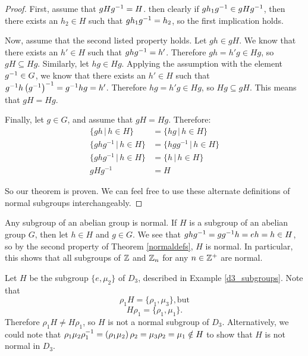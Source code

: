 \begin{proof}
First, assume that $gH\inv{g} = H$. then clearly if $gh_1\inv{g} \in gH\inv{g}$, then there exists an $h_2 \in H$ such that $gh_1\inv{g} = h_2$, so the first implication holds.

Now, assume that the second listed property holds. Let $gh \in gH$. We know that there exists an $h' \in H$ such that $gh\inv{g} = h'$. Therefore $gh = h'g \in Hg$, so $gH \subseteq Hg$. Similarly, let $hg \in Hg$. Applying the assumption with the element $\inv{g} \in G$, we know that there exists an $h' \in H$ such that $\inv{g}h\left(\inv{g}\right)^{-1} = \inv{g}hg = h'$. Therefore $hg = h'g \in Hg$, so $Hg \subseteq gH$. This means that $gH = Hg$.

Finally, let $g \in G$, and assume that $gH = Hg$. Therefore:
\begin{align*}
    \{gh \,|\, h \in H\} &= \{hg \,|\, h \in H\} \\
    \{ghg^{-1} \,|\, h \in H\} &= \{hgg^{-1} \,|\, h \in H\} \\
    \{ghg^{-1} \,|\, h \in H\} &= \{h \,|\, h \in H\} \\
    gHg^{-1} &= H
\end{align*}

So our theorem is proven. We can feel free to use these alternate definitions of normal subgroups interchangeably.

\end{proof}

\begin{example}
Any subgroup of an abelian group is normal. If $H$ is a subgroup of an abelian group $G$, then let $h \in H$ and $g \in G$. We see that $gh\inv g = g \inv g h = eh = h \in H$, so by the second property of Theorem \ref{normaldefs}, $H$ is normal. In particular, this shows that all subgroups of $\z$ and $\zn[n]$ for any $n \in \z^+$ are normal.
\end{example}

\begin{example}
\label{not_normal_d3}
Let $H$ be the subgroup $\{e, \mu_2\}$ of $D_3$, described in Example \ref{d3_subgroups}. Note that
\begin{equation*}
    \rho_1 H = \{\rho_1, \mu_3\}\mathrm{, but}
\end{equation*}
\begin{equation*}
    H \rho_1 = \{\rho_1, \mu_1\}.
\end{equation*}
Therefore $\rho_1 H \neq H\rho_1$, so $H$ is not a normal subgroup of $D_3$. Alternatively, we could note that $\rho_1\mu_2\inv{\rho_1} = \left(\rho_1 \mu_2\right)\rho_2 = \mu_3 \rho_2 = \mu_1 \notin H$ to show that $H$ is not normal in $D_3$.
\end{example}

